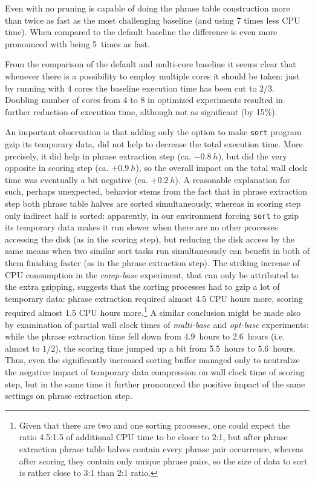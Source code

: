 Even with no pruning \eppex{} is capable of doing the phrase table construction more
than twice as fast as the most challenging baseline (and using 7 times less CPU time).
When compared to the default baseline the difference is even more pronounced with \eppex{}
being 5~times as fast.

From the comparison of the default and multi-core baseline it seems clear that whenever there
is a possibility to employ multiple cores it should be taken: just by running with 4 cores
the baseline execution time has been cut to $2/3$.
Doubling number of cores from 4 to 8 in optimized experiments resulted in further reduction
of execution time, although not as significant (by 15\%).

An important observation is that adding only the option to make \texttt{sort} program gzip
its temporary data, did not help to decrease the total execution time.
More precisely, it did help in phrase extraction step (ca. $-0.8~h$), but did the very opposite
in scoring step (ca. $+0.9~h$), so the overall impact on the total wall clock time was eventually
a bit negative (ca. $+0.2~h$).
A reasonable explanation for such, perhaps unexpected, behavior stems from the fact that in phrase
extraction step both phrase table halves are sorted simultaneously, whereas in scoring step
only indirect half is sorted:
apparently, in our environment forcing \texttt{sort} to gzip its temporary data makes it run
slower when there are no other processes accessing the disk (as in the scoring step), but reducing
the disk access by the same means when two similar sort tasks run simultaneously can benefit
in both of them finishing faster (as in the phrase extraction step).
The striking increase of CPU consumption in the \emph{comp-base} experiment, that can only be
attributed to the extra gzipping, suggests that the sorting processes had to gzip a lot of
temporary data:
phrase extraction required almost 4.5 CPU hours more, scoring required almost 1.5 CPU hours
more.\footnote{Given that there are two and one sorting processes, one could expect the ratio
4.5:1.5 of additional CPU time to be closer to 2:1, but after phrase extraction phrase table halves
contain every phrase pair occurrence, whereas after scoring they contain only unique phrase pairs,
so the size of data to sort is rather close to 3:1 than 2:1 ratio.}
A similar conclusion might be made also by examination of partial wall clock times of \emph{multi-base}
and \emph{opt-base} experiments: while the phrase extraction time fell down from 4.9~hours to 2.6~hours
(i.e. almost to $1/2$), the scoring time jumped up a bit from 5.5~hours to 5.6~hours.
Thus, even the significantly increased sorting buffer managed only to neutralize the negative impact of
temporary data compression on wall clock time of scoring step, but in the same time it further pronounced
the positive impact of the same settings on phrase extraction step.

